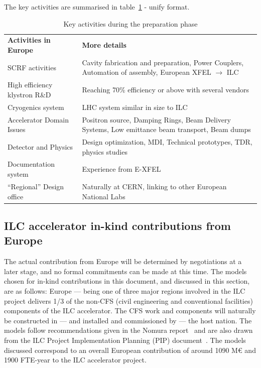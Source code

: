 \documentclass[%
 reprint,
 floatfix,
 amsmath,amssymb,
 aps,
]{revtex4-1}
\begin{document}
The key activities are summarised in table~\ref{fig:prep-phase-summary} - unify format.




\begin{table}[htbp]
\begin{ruledtabular}
\begin{tabular}{p{3.5cm}p{4.75cm}}
 \bfseries {Activities in Europe} &\bfseries{More details}                                                         \\
SCRF activities			&Cavity fabrication and preparation, Power Couplers, Automation of assembly, European XFEL $\rightarrow$ ILC\\
High efficiency klystron R\&D   &Reaching 70\% efficiency or above with several vendors   \\
Cryogenics system               &LHC system similar in size to ILC\\
Accelerator Domain Issues       &Positron source, Damping Rings, Beam Delivery Systems, Low emittance beam transport, Beam dumps\\
Detector and Physics            &Design optimization, MDI, Technical prototypes, TDR, physics studies\\
Documentation system            &Experience from E-XFEL                                       \\
“Regional” Design office        &Naturally at CERN, linking to other European National Labs \\
\end{tabular}
\end{ruledtabular}
\caption{\label{fig:prep-phase-summary} Key activities during the preparation phase}
\end{table}


\subsection{ILC accelerator in-kind contributions from Europe ~\label{sec:acc:constrphase}}

The actual contribution from Europe will be determined by negotiations at a 
later stage, and no formal commitments can be made at this time. The models 
chosen for in-kind contributions in this document, and discussed in this 
section, are as follows: Europe — being one of three major regions involved in 
the ILC project delivers 1/3 of the non-CFS (civil engineering and conventional facilities) 
components of the ILC accelerator. The CFS work 
and components will naturally be constructed in — and installed and 
commissioned by — the host nation. The models follow recommendations given in 
the Nomura report~\cite{Nomura-eng} and are also drawn from the ILC Project Implementation 
Planning (PIP) document~\cite{ILCPIP}. The models discussed correspond to an overall 
European contribution of around 1090 M\euro{} and 1900 FTE-year to the ILC accelerator project. 
\end{document}
